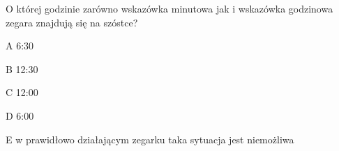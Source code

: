 \begin{tresc}
O której godzinie zarówno wskazówka minutowa jak i wskazówka godzinowa zegara znajdują się na szóstce?
\end{tresc}
\begin{wariant}{A} 6:30 \end{wariant}
\begin{wariant}{B} 12:30 \end{wariant}
\begin{wariant}{C} 12:00 \end{wariant}
\begin{wariant}{D} 6:00 \end{wariant}
\begin{wariant}{E} w prawidłowo działającym zegarku taka sytuacja jest niemożliwa \end{wariant}
